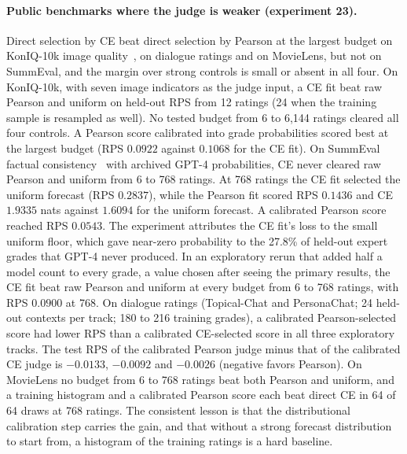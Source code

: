 \paragraph{Public benchmarks where the judge is weaker (experiment 23).}
Direct selection by CE beat direct selection by Pearson at the largest budget on KonIQ-10k image quality~\citep{hosu2020koniq}, on dialogue ratings and on MovieLens, but not on SummEval, and the margin over strong controls is small or absent in all four.
On KonIQ-10k, with seven image indicators as the judge input, a CE fit beat raw Pearson and uniform on held-out RPS from 12 ratings (24 when the training sample is resampled as well). No tested budget from 6 to 6{,}144 ratings cleared all four controls. A Pearson score calibrated into grade probabilities scored best at the largest budget (RPS $0.0922$ against $0.1068$ for the CE fit).
On SummEval factual consistency~\citep{fabbri2021summeval} with archived GPT-4 probabilities, CE never cleared raw Pearson and uniform from 6 to 768 ratings. At 768 ratings the CE fit selected the uniform forecast (RPS $0.2837$), while the Pearson fit scored RPS $0.1436$ and CE $1.9335$ nats against $1.6094$ for the uniform forecast. A calibrated Pearson score reached RPS $0.0543$.
The experiment attributes the CE fit's loss to the small uniform floor, which gave near-zero probability to the 27.8\% of held-out expert grades that GPT-4 never produced. In an exploratory rerun that added half a model count to every grade, a value chosen after seeing the primary results, the CE fit beat raw Pearson and uniform at every budget from 6 to 768 ratings, with RPS $0.0900$ at 768.
On dialogue ratings (Topical-Chat and PersonaChat; 24 held-out contexts per track; 180 to 216 training grades), a calibrated Pearson-selected score had lower RPS than a calibrated CE-selected score in all three exploratory tracks. The test RPS of the calibrated Pearson judge minus that of the calibrated CE judge is $-0.0133$, $-0.0092$ and $-0.0026$ (negative favors Pearson).
On MovieLens no budget from 6 to 768 ratings beat both Pearson and uniform, and a training histogram and a calibrated Pearson score each beat direct CE in 64 of 64 draws at 768 ratings.
The consistent lesson is that the distributional calibration step carries the gain, and that without a strong forecast distribution to start from, a histogram of the training ratings is a hard baseline.

